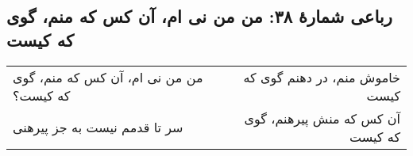 \begin{center}
\section*{رباعی شمارهٔ ۳۸: من من نی ام، آن کس که منم، گوی که کیست}
\label{sec:038}
\begin{longtable}{l p{0.5cm} r}
من من نی ام، آن کس که منم، گوی که کیست؟
&&
خاموش منم، در دهنم گوی که کیست
\\
سر تا قدمم نیست به جز پیرهنی
&&
آن کس که منش پیرهنم، گوی که کیست
\\
\end{longtable}
\end{center}
